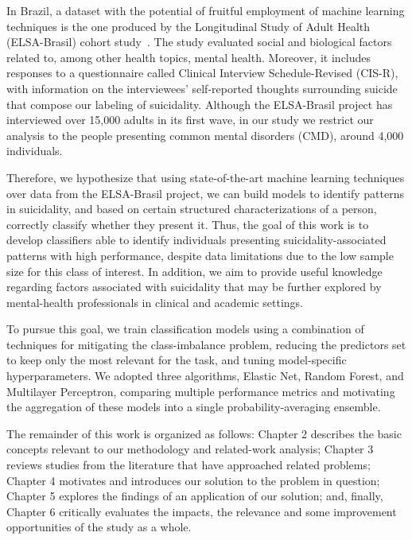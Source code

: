In Brazil, a dataset with the potential of fruitful employment of machine learning techniques is the one produced by the Longitudinal Study of Adult Health (ELSA-Brasil) cohort study~\cite{Schmidt2015}.
The study evaluated social and biological factors related to, among other health topics, mental health.
Moreover, it includes responses to a questionnaire called Clinical Interview Schedule-Revised (CIS-R), with information on the interviewees' self-reported thoughts surrounding suicide ~\cite{Nunes2016, Lewis1992} that compose our labeling of suicidality.
Although the ELSA-Brasil project has interviewed over 15,000 adults in its first wave, in our study we restrict our analysis to the people presenting common mental disorders (CMD), around 4,000 individuals.

Therefore, we hypothesize that using state-of-the-art machine learning techniques over data from the ELSA-Brasil project, we can build models to identify patterns in suicidality, and based on certain structured characterizations of a person, correctly classify whether they present it.
Thus, the goal of this work is to develop classifiers able to identify individuals presenting suicidality-associated patterns with high performance, despite data limitations due to the low sample size for this class of interest.
In addition, we aim to provide useful knowledge regarding factors associated with suicidality that may be further explored by mental-health professionals in clinical and academic settings.

To pursue this goal, we train classification models using a combination of techniques for mitigating the class-imbalance problem, reducing the predictors set to keep only the most relevant for the task, and tuning model-specific hyperparameters.
We adopted three algorithms, Elastic Net, Random Forest, and Multilayer Perceptron, comparing multiple performance metrics and motivating the aggregation of these models into a single probability-averaging ensemble.

The remainder of this work is organized as follows: Chapter 2 describes the basic concepts relevant to our methodology and related-work analysis;
Chapter 3 reviews studies from the literature that have approached related problems;
Chapter 4 motivates and introduces our solution to the problem in question;
Chapter 5 explores the findings of an application of our solution;
and, finally, Chapter 6 critically evaluates the impacts, the relevance and some improvement opportunities of the study as a whole.

